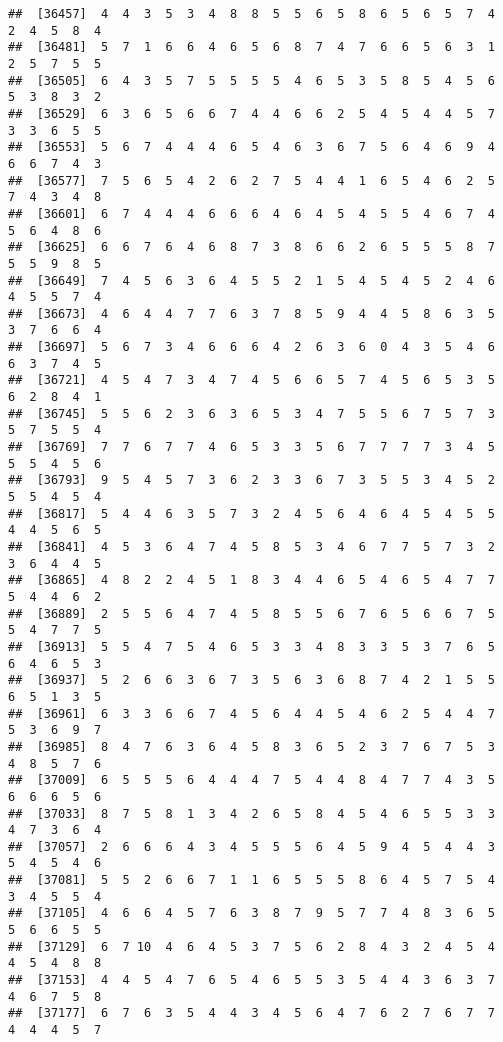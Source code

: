 \documentclass[
]{book}
\begin{document}
\begin{verbatim}
##  [36457]  4  4  3  5  3  4  8  8  5  5  6  5  8  6  5  6  5  7  4  2  4  5  8  4
##  [36481]  5  7  1  6  6  4  6  5  6  8  7  4  7  6  6  5  6  3  1  2  5  7  5  5
##  [36505]  6  4  3  5  7  5  5  5  5  4  6  5  3  5  8  5  4  5  6  5  3  8  3  2
##  [36529]  6  3  6  5  6  6  7  4  4  6  6  2  5  4  5  4  4  5  7  3  3  6  5  5
##  [36553]  5  6  7  4  4  4  6  5  4  6  3  6  7  5  6  4  6  9  4  6  6  7  4  3
##  [36577]  7  5  6  5  4  2  6  2  7  5  4  4  1  6  5  4  6  2  5  7  4  3  4  8
##  [36601]  6  7  4  4  4  6  6  6  4  6  4  5  4  5  5  4  6  7  4  5  6  4  8  6
##  [36625]  6  6  7  6  4  6  8  7  3  8  6  6  2  6  5  5  5  8  7  5  5  9  8  5
##  [36649]  7  4  5  6  3  6  4  5  5  2  1  5  4  5  4  5  2  4  6  4  5  5  7  4
##  [36673]  4  6  4  4  7  7  6  3  7  8  5  9  4  4  5  8  6  3  5  3  7  6  6  4
##  [36697]  5  6  7  3  4  6  6  6  4  2  6  3  6  0  4  3  5  4  6  6  3  7  4  5
##  [36721]  4  5  4  7  3  4  7  4  5  6  6  5  7  4  5  6  5  3  5  6  2  8  4  1
##  [36745]  5  5  6  2  3  6  3  6  5  3  4  7  5  5  6  7  5  7  3  5  7  5  5  4
##  [36769]  7  7  6  7  7  4  6  5  3  3  5  6  7  7  7  7  3  4  5  5  5  4  5  6
##  [36793]  9  5  4  5  7  3  6  2  3  3  6  7  3  5  5  3  4  5  2  5  5  4  5  4
##  [36817]  5  4  4  6  3  5  7  3  2  4  5  6  4  6  4  5  4  5  5  4  4  5  6  5
##  [36841]  4  5  3  6  4  7  4  5  8  5  3  4  6  7  7  5  7  3  2  3  6  4  4  5
##  [36865]  4  8  2  2  4  5  1  8  3  4  4  6  5  4  6  5  4  7  7  5  4  4  6  2
##  [36889]  2  5  5  6  4  7  4  5  8  5  5  6  7  6  5  6  6  7  5  5  4  7  7  5
##  [36913]  5  5  4  7  5  4  6  5  3  3  4  8  3  3  5  3  7  6  5  6  4  6  5  3
##  [36937]  5  2  6  6  3  6  7  3  5  6  3  6  8  7  4  2  1  5  5  6  5  1  3  5
##  [36961]  6  3  3  6  6  7  4  5  6  4  4  5  4  6  2  5  4  4  7  5  3  6  9  7
##  [36985]  8  4  7  6  3  6  4  5  8  3  6  5  2  3  7  6  7  5  3  4  8  5  7  6
##  [37009]  6  5  5  5  6  4  4  4  7  5  4  4  8  4  7  7  4  3  5  6  6  6  5  6
##  [37033]  8  7  5  8  1  3  4  2  6  5  8  4  5  4  6  5  5  3  3  4  7  3  6  4
##  [37057]  2  6  6  6  4  3  4  5  5  5  6  4  5  9  4  5  4  4  3  5  4  5  4  6
##  [37081]  5  5  2  6  6  7  1  1  6  5  5  5  8  6  4  5  7  5  4  3  4  5  5  4
##  [37105]  4  6  6  4  5  7  6  3  8  7  9  5  7  7  4  8  3  6  5  5  6  6  5  5
##  [37129]  6  7 10  4  6  4  5  3  7  5  6  2  8  4  3  2  4  5  4  4  5  4  8  8
##  [37153]  4  4  5  4  7  6  5  4  6  5  5  3  5  4  4  3  6  3  7  4  6  7  5  8
##  [37177]  6  7  6  3  5  4  4  3  4  5  6  4  7  6  2  7  6  7  7  4  4  4  5  7

\end{verbatim}
\end{document}
